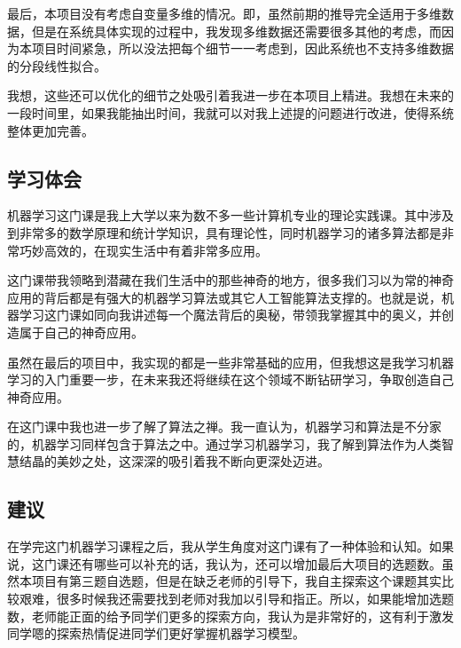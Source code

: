 最后，本项目没有考虑自变量多维的情况。即，虽然前期的推导完全适用于多维数据，但是在系统具体实现的过程中，我发现多维数据还需要很多其他的考虑，而因为本项目时间紧急，所以没法把每个细节一一考虑到，因此系统也不支持多维数据的分段线性拟合。

我想，这些还可以优化的细节之处吸引着我进一步在本项目上精进。我想在未来的一段时间里，如果我能抽出时间，我就可以对我上述提的问题进行改进，使得系统整体更加完善。


\subsection{学习体会}

机器学习这门课是我上大学以来为数不多一些计算机专业的理论实践课。其中涉及到非常多的数学原理和统计学知识，具有理论性，同时机器学习的诸多算法都是非常巧妙高效的，在现实生活中有着非常多应用。

这门课带我领略到潜藏在我们生活中的那些神奇的地方，很多我们习以为常的神奇应用的背后都是有强大的机器学习算法或其它人工智能算法支撑的。也就是说，机器学习这门课如同向我讲述每一个魔法背后的奥秘，带领我掌握其中的奥义，并创造属于自己的神奇应用。

虽然在最后的项目中，我实现的都是一些非常基础的应用，但我想这是我学习机器学习的入门重要一步，在未来我还将继续在这个领域不断钻研学习，争取创造自己神奇应用。

在这门课中我也进一步了解了算法之禅。我一直认为，机器学习和算法是不分家的，机器学习同样包含于算法之中。通过学习机器学习，我了解到算法作为人类智慧结晶的美妙之处，这深深的吸引着我不断向更深处迈进。


\subsection{建议}

在学完这门机器学习课程之后，我从学生角度对这门课有了一种体验和认知。如果说，这门课还有哪些可以补充的话，我认为，还可以增加最后大项目的选题数。虽然本项目有第三题自选题，但是在缺乏老师的引导下，我自主探索这个课题其实比较艰难，很多时候我还需要找到老师对我加以引导和指正。所以，如果能增加选题数，老师能正面的给予同学们更多的探索方向，我认为是非常好的，这有利于激发同学嗯的探索热情促进同学们更好掌握机器学习模型。
